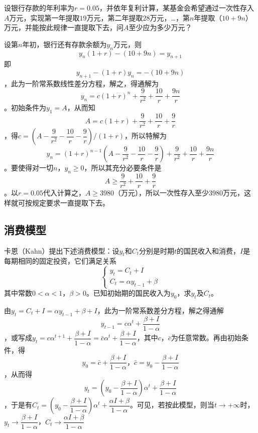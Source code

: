 		\example 设银行存款的年利率为$r=0.05$，并依年复利计算，某基金会希望通过一次性存入$A$万元，实现第一年提取$19$万元，第二年提取$28$万元，\ldots，第$n$年提取（$10 + 9n$）万元，并能按此规律一直提取下去，问$A$至少应为多少万元？

		\answer 设第$n$年初，银行还有存款余额为$y_n$万元，则$$y_n(1+r) - (10 + 9n) = y_{n+1}$$即$$y_{n+1} - (1+r)y_n = -(10 + 9n)$$，此为一阶常系数线性差分方程，解之，得通解为$$y_n = c(1+r)^n + \frac{9}{r^2} + \frac{10}{r} + \frac{9n}{r}$$。初始条件为$y_1 = A$，从而知$$A = c(1+r) + \frac{9}{r^2} + \frac{10}{r} + \frac{9}{r}$$，得$c = (A - \dfrac{9}{r^2} - \dfrac{10}{r} - \dfrac{9}{r}) / (1+r)$，所以特解为$$y_n = (1+r)^{n - 1}(A - \frac{9}{r^2} - \frac{10}{r} - \frac{9}{r}) + \frac{9}{r^2} + \frac{10}{r} + \frac{9n}{r}$$。要使得对一切$n$，$y_n \geqslant 0$，所以其充分必要条件是$$A \geqslant \frac{9}{r^2} + \frac{10}{r} + \frac{9}{r}$$。以$r = 0.05$代入计算之，$A \geqslant 3980$（万元），所以一次性存入至少$3980$万元，这样就可按规定要求一直提取下去。

		\subsection{消费模型}

		\example 卡恩（Kahn）提出下述消费模型：设$y_t$和$C_t$分别是时期$t$的国民收入和消费，$I$是每期相同的固定投资，它们满足关系
		\begin{displaymath}
			\begin{cases}
				y_t = C_t + I \\	
				C_t = \alpha y_{t-1} + \beta
			\end{cases}
		\end{displaymath}
		其中常数$0 < \alpha < 1$，$\beta > 0$。已知初始期的国民收入为$y_0$，求$y_t$及$C_t$。

		\answer 由$y_t = C_t + I = \alpha y_{t-1} + \beta + I$，此为一阶常系数差分方程，解之得通解$$y_{t-1} = c \alpha ^t + \frac{\beta + I}{1 - \alpha}$$，或写成$y_t = c \alpha ^{t+1} + \dfrac{\beta + I}{1 - \alpha} = \bar c \alpha ^t + \dfrac{\beta + I}{1 - \alpha}$，其中$c$，$\bar c$为任意常数。再由初始条件，得$$y_0 =\bar c + \frac{\beta + I}{1 - \alpha} \text{，} \bar c = y_0 - \frac{\beta + I}{1 - \alpha}$$，从而得$$y_t = \left(y_0 - \frac{\beta + I}{1 - \alpha}\right) \alpha ^t + \frac{\beta + I}{1 - \alpha}$$，于是有$C_t = \left(y_0 - \dfrac{\beta + I}{1 - \alpha}\right) \alpha ^t + \dfrac{\alpha I + \beta}{1 - \alpha}$。可见，若按此模型，则当$t \to +\infty$时，$y_t \to \dfrac{\beta + I}{1 - \alpha}$，$C_t \to \dfrac{\alpha I + \beta}{1 - \alpha}$


